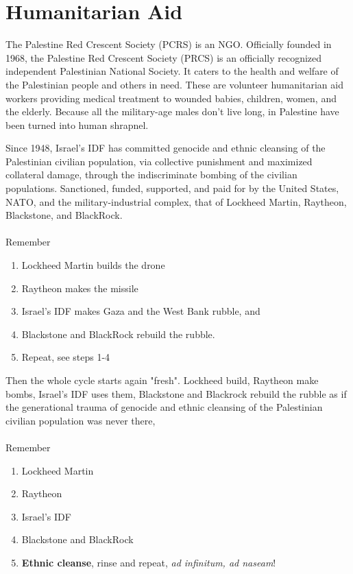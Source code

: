 \documentclass[16pt,openany,oneside]{book}
\begin{document}
\chapter{Humanitarian Aid}

The Palestine Red Crescent Society (PCRS) \cite{prcs2023palestine} is an NGO. Officially founded in 1968, the Palestine Red Crescent Society (PRCS) is an officially recognized independent Palestinian National Society. It caters to the health and welfare of the Palestinian people and others in need. These are volunteer humanitarian aid workers providing medical treatment to wounded babies, children, women, and the elderly. Because all the military-age males don't live long, in Palestine have been turned into human shrapnel.

Since 1948, Israel's IDF has committed genocide and ethnic cleansing of the Palestinian civilian population, via collective punishment and maximized collateral damage, through the indiscriminate bombing of the civilian populations. Sanctioned, funded, supported, and paid for by the United States, NATO, and the military-industrial complex, that of Lockheed Martin, Raytheon, Blackstone, and BlackRock. 
\\\\
Remember

\begin{enumerate}
    \item Lockheed Martin builds the drone
    \item Raytheon makes the missile
    \item Israel's IDF makes Gaza and the West Bank rubble, and 
    \item Blackstone and BlackRock rebuild the rubble.
    \item[] Repeat, see steps 1-4
\end{enumerate}

Then the whole cycle starts again 
    "fresh". Lockheed build, 
Raytheon make bombs, Israel's IDF uses them, Blackstone and Blackrock rebuild the rubble as if the generational trauma of genocide and ethnic cleansing of the Palestinian civilian population was never there,
\\\\ 
Remember

\begin{enumerate}
    \item Lockheed Martin 
    \item Raytheon
    \item Israel's IDF
    \item Blackstone and BlackRock
    \item[] \textbf{Ethnic cleanse}, rinse and repeat, \textit{ad infinitum, ad naseam}!
\end{enumerate}
\end{document}
